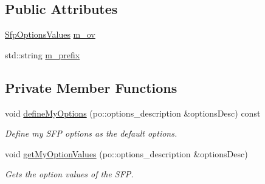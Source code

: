 \subsection*{Public Attributes}
\begin{DoxyCompactItemize}
\item 
\hyperlink{class_q_u_e_s_o_1_1_sfp_options_values}{Sfp\-Options\-Values} \hyperlink{class_q_u_e_s_o_1_1_statistical_forward_problem_options_a87ad4acd32801ea3edd5e65ffb093dbf}{m\-\_\-ov}
\item 
std\-::string \hyperlink{class_q_u_e_s_o_1_1_statistical_forward_problem_options_adc3ea162cb9889b19128686aa657ab30}{m\-\_\-prefix}
\end{DoxyCompactItemize}
\subsection*{Private Member Functions}
\begin{DoxyCompactItemize}
\item 
void \hyperlink{class_q_u_e_s_o_1_1_statistical_forward_problem_options_afc27e9772dc59d31e7a3e88d6f7522d0}{define\-My\-Options} (po\-::options\-\_\-description \&options\-Desc) const 
\begin{DoxyCompactList}\small\item\em Define my S\-F\-P options as the default options. \end{DoxyCompactList}\item 
void \hyperlink{class_q_u_e_s_o_1_1_statistical_forward_problem_options_a697880e27f0c65ac03f54243ac467a0e}{get\-My\-Option\-Values} (po\-::options\-\_\-description \&options\-Desc)
\begin{DoxyCompactList}\small\item\em Gets the option values of the S\-F\-P. \end{DoxyCompactList}\end{DoxyCompactItemize}
